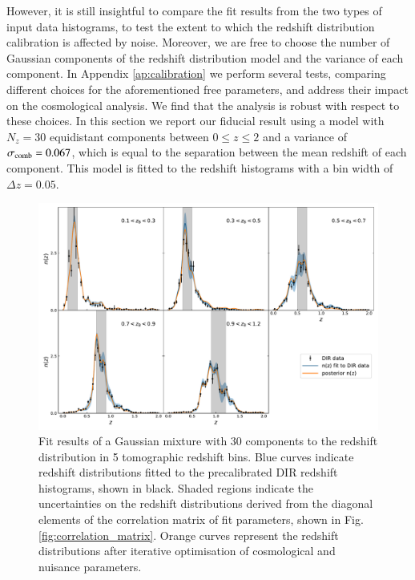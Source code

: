 \documentclass{aa}
\begin{document}
However, it is still insightful to compare the fit results from the two types of input data histograms, to test the extent to which the redshift distribution calibration is affected by noise. Moreover, we are free to choose the number of Gaussian components of the redshift distribution model and the variance of each component. In Appendix \ref{ap:calibration} we perform several tests, comparing different choices for the aforementioned free parameters, and address their impact on the cosmological analysis. We find that the analysis is robust with respect to these choices. In this section we report our fiducial result using a model with $N_z = 30$ equidistant components between $0\leq z \leq 2$ and a variance of $\sigma_{\rm comb} = 0.067$, which is equal to the separation between the mean redshift of each component. This model is fitted to the redshift histograms with a bin width of $\Delta z = 0.05$.
\begin{figure}
\centering
\includegraphics[width=\linewidth]{plots/optimisation_result.pdf}
\caption{Fit results of a Gaussian mixture with 30 components to the redshift distribution in 5 tomographic redshift bins. Blue curves indicate redshift distributions fitted to the precalibrated DIR redshift histograms, shown in black. Shaded regions indicate the uncertainties on the redshift distributions derived from the diagonal elements of the correlation matrix of fit parameters, shown in Fig. \ref{fig:correlation_matrix}. Orange curves represent the redshift distributions after iterative optimisation of cosmological and nuisance parameters.}
\label{fig:comb}
\end{figure}
\end{document}
